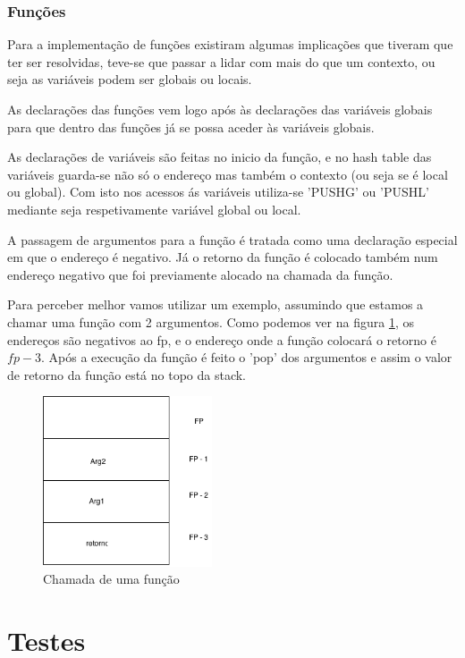 \documentclass[a4paper,10pt]{report}
\begin{document}
\subsection{Funções}

Para a implementação de funções existiram algumas implicações que tiveram que ter ser resolvidas, teve-se que passar a lidar com mais do que um contexto, ou seja as variáveis podem ser globais ou locais.

As declarações das funções vem logo após às declarações das variáveis globais para que dentro das funções já se possa aceder às variáveis globais.

As declarações de variáveis são feitas no inicio da função, e no hash table das variáveis guarda-se não só o endereço mas também o contexto (ou seja se é local ou global). Com isto nos acessos ás variáveis utiliza-se 'PUSHG' ou 'PUSHL' mediante seja respetivamente variável global ou local.

A passagem de argumentos para a função é tratada como uma declaração especial em que o endereço é negativo.
Já o retorno da função é colocado também num endereço negativo que foi previamente alocado na chamada da função.

Para perceber melhor vamos utilizar um exemplo, assumindo que estamos a chamar uma função com 2 argumentos.
Como podemos ver na figura \ref{fig:functionStack}, os endereços são negativos ao fp, e o endereço onde a função colocará o retorno é $fp - 3$.
Após a execução da função é feito o 'pop' dos argumentos e assim o valor de retorno da função está no topo da stack. 

\begin{figure}
\centering
\includegraphics[width=5cm]{functionStack.png}
\caption{Chamada de uma função}
\label{fig:functionStack}
\end{figure}

\chapter{Testes}
\end{document}
